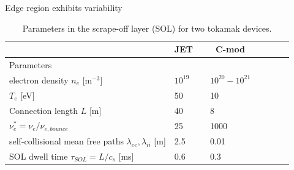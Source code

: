 \documentclass{beamer}
\begin{document}
\begin{frame}{Edge region exhibits variability}
\begin{table}\centering
\begin{tabular}{@{}llclclcl@{}}\toprule[2 pt]
&\multicolumn{1}{c}{JET} & \phantom{abc} & \multicolumn{1}{c}{C-mod} \\
\midrule
\phantom{a}Parameters & &&  \\
\phantom{a}electron density $n_e$ [$\text{m}^{-3}$]	&	$10^{19}$	&&	$10^{20} -10^{21}$       \\
\phantom{a}$T_e$ [eV]	&	50	&&	10 \\
\phantom{a}Connection length $L$ [m]         &	40	        &&	8	\\
\phantom{a}$\nu_e^* = \nu_e / \nu_{e,bounce}$	& 25    	&&	1000	\\
\phantom{a}self-collisional mean free paths $\lambda_{ee}, \lambda_{ii}$ [m]  &	2.5	        &&	0.01	\\
\phantom{a}SOL dwell time $\tau_{SOL} = L / c_s$ [ms]  &	0.6	        &&	0.3	\\
\bottomrule[2 pt]
\end{tabular}
\caption{Parameters in the scrape-off layer (SOL) for two tokamak devices.}
\end{table}


\end{frame}

\end{document}
